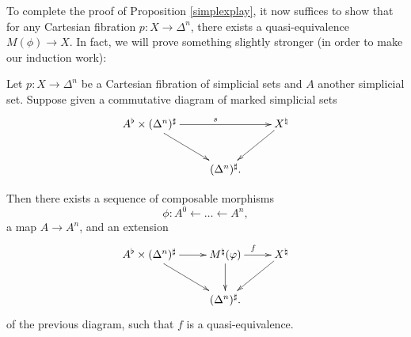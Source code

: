 To complete the proof of Proposition \ref{simplexplay}, it now suffices to show that for any Cartesian fibration $p: X \rightarrow \Delta^n$, there exists a quasi-equivalence $M(\phi) \rightarrow X$.
In fact, we will prove something slightly stronger (in order to make
our induction work):

\begin{proposition}\label{sharpsimplex}
Let $p: X \rightarrow \Delta^n$ be a Cartesian fibration of simplicial sets and $A$ another simplicial set.
Suppose given a commutative diagram of marked simplicial sets
$$ \xymatrix{ A^{\flat} \times (\Delta^n)^{\sharp} \ar[dr] \ar[rr]^{s} & & X^{\natural} \ar[dl] \\
& (\Delta^n)^{\sharp}. & }$$

Then there exists a sequence of composable
morphisms
$$ \phi: A^0 \leftarrow \ldots \leftarrow A^n,$$
a map $A \rightarrow A^n$, and an extension
$$ \xymatrix{ A^{\flat} \times (\Delta^n)^{\sharp} \ar[dr] \ar[r] & M^{\natural}(\phi) \ar[r]^{f} \ar[d] & X^{\natural} \ar[dl] \\
& (\Delta^n)^{\sharp}. & }$$
of the previous diagram, such that $f$ is a quasi-equivalence.
\end{proposition}

